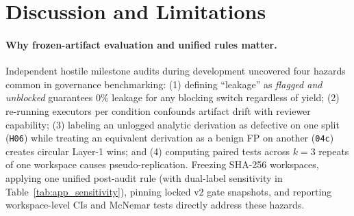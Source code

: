 \section{Discussion and Limitations}
\label{sec:limitations}

\begin{table}[!t]
\centering
\caption{\textbf{Comparison with autonomous research harnesses and scientific auditing benchmarks.}}
\label{tab:related}
\setlength{\tabcolsep}{4.0pt}
\scriptsize
{}
\end{table}

\paragraph{Why frozen-artifact evaluation and unified rules matter.}
Independent hostile milestone audits during development uncovered four hazards common in governance benchmarking:
(1) defining ``leakage'' as \emph{flagged and unblocked} guarantees 0\% leakage for any blocking switch regardless of yield;
(2) re-running executors per condition confounds artifact drift with reviewer capability;
(3) labeling an unlogged analytic derivation as defective on one split (\texttt{H06}) while treating an equivalent derivation as a benign FP on another (\texttt{04c}) creates circular Layer-1 wins; and
(4) computing paired tests across $k=3$ repeats of one workspace causes pseudo-replication.
Freezing SHA-256 workspaces, applying one unified post-audit rule (with dual-label sensitivity in Table~\ref{tab:app_sensitivity}), pinning locked v2 gate snapshots, and reporting workspace-level CIs and McNemar tests directly address these hazards.


